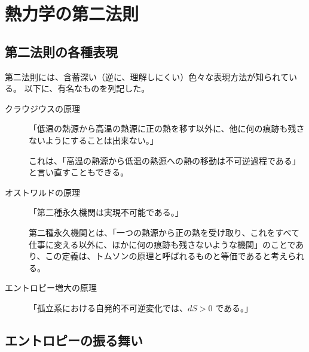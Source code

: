 \documentclass[uplatex,dvipdfmx,a4paper,11pt]{jsarticle}
\begin{document}
\begin{enumerate}
%
%

\end{enumerate}

\newpage

\section{熱力学の第二法則}

\subsection{第二法則の各種表現}
第二法則には、含蓄深い（逆に、理解しにくい）色々な表現方法が知られている。
以下に、有名なものを列記した。

\begin{description}
\item[クラウジウスの原理]
「低温の熱源から高温の熱源に正の熱を移す以外に、他に何の痕跡も残さないようにすることは出来ない。」

これは、「高温の熱源から低温の熱源への熱の移動は不可逆過程である」と言い直すこともできる。

\item[オストワルドの原理]
「第二種永久機関は実現不可能である。」

第二種永久機関とは、「一つの熱源から正の熱を受け取り、これをすべて仕事に変える以外に、ほかに何の痕跡も残さないような機関」のことであり、この定義は、トムソンの原理と呼ばれるものと等価であると考えられる。

\item[エントロピー増大の原理]
「孤立系における自発的不可逆変化では、$dS > 0$ である。」
\end{description}

\subsection{エントロピーの振る舞い}
\end{document}
